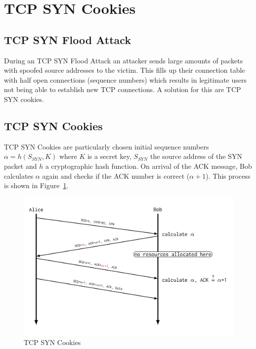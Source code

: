 
\section{TCP SYN Cookies}

\subsection{TCP SYN Flood Attack}
During an TCP SYN Flood Attack an attacker sends large amounts of packets with spoofed source addresses to the victim.
This fills up their connection table with half open connections (sequence numbers) which results in legitimate users not being able to establish new TCP connections.
A solution for this are TCP SYN cookies.

\subsection{TCP SYN Cookies}
TCP SYN Cookies are particularly chosen initial sequence numbers $\alpha = h(S_{SYN},K)$ where $K$ is a secret key, $S_{SYN}$ the source address of the SYN packet and $h$ a cryptographic hash function.
On arrival of the ACK message, Bob calculates $\alpha$ again and checks if the ACK number is correct ($\alpha + 1$).
This process is shown in Figure~\ref{fig:tcp_syn_cookies}.
\begin{figure}[h]
  \centering
  \includegraphics[width=.6\textwidth]{figures/tcp_syn_cookies.png}
  \caption{TCP SYN Cookies}\label{fig:tcp_syn_cookies}
\end{figure}

